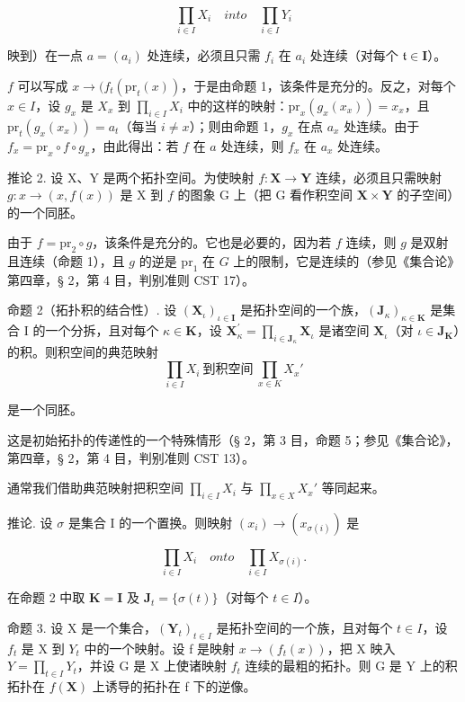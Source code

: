 \[
\prod_ {i \in I} X _ {i} \quad i n t o \quad \prod_ {i \in I} Y _ {i}
\]

映到）在一点 \(a = (a_{i})\) 处连续，必须且只需 \(f_{i}\) 在 \(a_{i}\) 处连续（对每个 \(\mathfrak{t} \in \mathbf{I}\)）。

\(f\) 可以写成 \(x \to (f_{t}(\mathrm{pr}_{t}(x))\)，于是由命题 1，该条件是充分的。反之，对每个 \(x \in I\)，设 \(g_{x}\) 是 \(X_{x}\) 到 \(\prod_{i \in I} X_{i}\) 中的这样的映射：\(\mathrm{pr}_{x}(g_{x}(x_{x})) = x_{x}\)，且 \(\mathrm{pr}_{t}(g_{x}(x_{x})) = a_{t}\)（每当 \(i \neq x\)）；则由命题 1，\(g_{x}\) 在点 \(a_{x}\) 处连续。由于 \(f_{x} = \mathrm{pr}_{x} \circ f \circ g_{x}\)，由此得出：若 \(f\) 在 \(a\) 处连续，则 \(f_{x}\) 在 \(a_{x}\) 处连续。

推论 2. 设 X、Y 是两个拓扑空间。为使映射 \(f: \mathbf{X} \to \mathbf{Y}\) 连续，必须且只需映射 \(g: x \to (x, f(x))\) 是 X 到 \(f\) 的图象 G 上（把 G 看作积空间 \(\mathbf{X} \times \mathbf{Y}\) 的子空间）的一个同胚。

由于 \(f = \mathrm{pr}_2 \circ g\)，该条件是充分的。它也是必要的，因为若 \(f\) 连续，则 \(g\) 是双射且连续（命题 1），且 \(g\) 的逆是 \(\mathrm{pr}_1\) 在 \(G\) 上的限制，它是连续的（参见《集合论》第四章，§ 2，第 4 目，判别准则 CST 17）。

命题 2（拓扑积的结合性）. 设 \((\mathbf{X}_{\iota})_{\iota \in \mathbf{I}}\) 是拓扑空间的一个族，\((\mathbf{J}_{\kappa})_{\kappa \in \mathbf{K}}\) 是集合 I 的一个分拆，且对每个 \(\kappa \in \mathbf{K}\)，设 \(\mathbf{X}_{\kappa}^{\prime} = \prod_{i\in \mathbf{J}_{\kappa}}\mathbf{X}_{\iota}\) 是诸空间 \(\mathbf{X}_{\iota}\)（对 \(\iota \in \mathbf{J}_{\mathbf{K}}\)）的积。则积空间的典范映射
\relax{}
\[\prod_{i \in I} X_i\ \text{到积空间}\ \prod_{x \in K} X_x'\]

是一个同胚。

这是初始拓扑的传递性的一个特殊情形（§ 2，第 3 目，命题 5；参见《集合论》，第四章，§ 2，第 4 目，判别准则 CST 13）。

通常我们借助典范映射把积空间 \(\prod_{i\in I}X_i\) 与 \(\prod_{x\in X}X_x'\) 等同起来。

推论. 设 \(\sigma\) 是集合 I 的一个置换。则映射 \((x_{i})\to (x_{\sigma(i)})\) 是

\[
\prod_ {i \in I} X _ {i} \quad onto \quad \prod_ {i \in I} X _ {\sigma (i)}.
\]

在命题 2 中取 \(\mathbf{K} = \mathbf{I}\) 及 \(\mathbf{J}_t = \{\sigma(t)\}\)（对每个 \(t \in I\)）。

命题 3. 设 X 是一个集合，\((\mathbf{Y}_{t})_{t\in I}\) 是拓扑空间的一个族，且对每个 \(t\in I\)，设 \(f_{t}\) 是 X 到 \(Y_{t}\) 中的一个映射。设 f 是映射 \(x\to(f_{t}(x))\)，把 X 映入 \(Y=\prod_{t\in I}Y_{t}\)，并设 G 是 X 上使诸映射 \(f_{t}\) 连续的最粗的拓扑。则 G 是 Y 上的积拓扑在 \(f(\mathbf{X})\) 上诱导的拓扑在 f 下的逆像。

